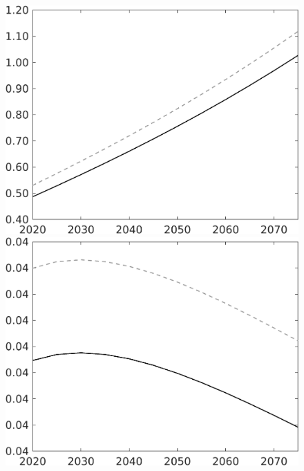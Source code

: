 \documentclass[12pt]{article}
\begin{document}
\begin{figure}[h!!]
\begin{minipage}[]{0.32\textwidth}
	\end{minipage}	
\begin{minipage}[]{0.32\textwidth}
\includegraphics[width=1\textwidth]{../../codding_model/own_basedOnFried/optimalPol_010922_revision/figures/all_13Sept22/CompTaul_Equlab_LFBAU_Reg0_F_spillover0_nsk1_xgr0_knspil1_sep1_countec0_GovRev0_etaa0.79_lgd0.png}
\end{minipage}	
\begin{minipage}[]{0.32\textwidth}
\includegraphics[width=1\textwidth]{../../codding_model/own_basedOnFried/optimalPol_010922_revision/figures/all_13Sept22/CompTaul_Equlab_LFBAU_Reg0_G_spillover0_nsk1_xgr0_knspil1_sep1_countec0_GovRev0_etaa0.79_lgd0.png}

\end{minipage}
\end{figure}
\end{document}
